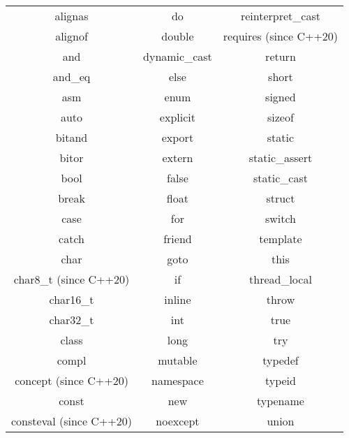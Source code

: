 \documentclass[../../LearnCpp.tex]{subfiles}
\begin{document}

\begin{center}
  \begin{tabular}{ |c|c|c| }
    \hline

    alignas                  & do            & reinterpret\_cast      \\
    alignof                  & double        & requires (since C++20) \\
    and                      & dynamic\_cast & return                 \\
    and\_eq                  & else          & short                  \\
    asm                      & enum          & signed                 \\
    auto                     & explicit      & sizeof                 \\
    bitand                   & export        & static                 \\
    bitor                    & extern        & static\_assert         \\
    bool                     & false         & static\_cast           \\
    break                    & float         & struct                 \\
    case                     & for           & switch                 \\
    catch                    & friend        & template               \\
    char                     & goto          & this                   \\
    char8\_t (since C++20)   & if            & thread\_local          \\
    char16\_t                & inline        & throw                  \\
    char32\_t                & int           & true                   \\
    class                    & long          & try                    \\
    compl                    & mutable       & typedef                \\
    concept (since C++20)    & namespace     & typeid                 \\
    const                    & new           & typename               \\
    consteval (since C++20)  & noexcept      & union                  \\

\end{tabular}
\end{center}
\end{document}
